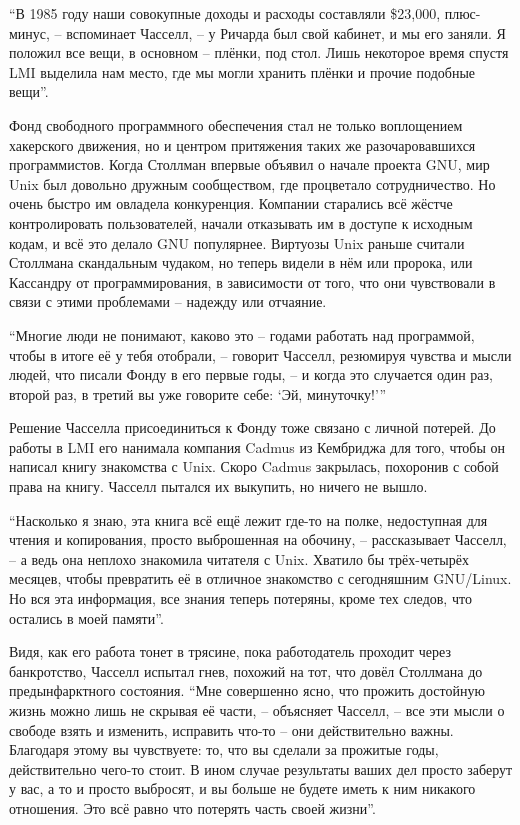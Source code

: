 \enquote{В 1985 году наши совокупные доходы и расходы составляли \$23,000, плюс-минус, -- вспоминает Часселл, -- у Ричарда был свой кабинет, и мы его заняли. Я положил все вещи, в основном -- плёнки, под стол. Лишь некоторое время спустя LMI выделила нам место, где мы могли хранить плёнки и прочие подобные вещи}.

Фонд свободного программного обеспечения стал не только воплощением хакерского движения, но и центром притяжения таких же разочаровавшихся программистов. Когда Столлман впервые объявил о начале проекта GNU, мир Unix был довольно дружным сообществом, где процветало сотрудничество. Но очень быстро им овладела конкуренция. Компании старались всё жёстче контролировать пользователей, начали отказывать им в доступе к исходным кодам, и всё это делало GNU популярнее. Виртуозы Unix раньше считали Столлмана скандальным чудаком, но теперь видели в нём или пророка, или Кассандру от программирования, в зависимости от того, что они чувствовали в связи с этими проблемами -- надежду или отчаяние.

\enquote{Многие люди не понимают, каково это -- годами работать над программой, чтобы в итоге её у тебя отобрали, -- говорит Часселл, резюмируя чувства и мысли людей, что писали Фонду в его первые годы, -- и когда это случается один раз, второй раз, в третий вы уже говорите себе: \enquote{Эй, минуточку!}\hspace{0.01in}}

Решение Часселла присоединиться к Фонду тоже связано с личной потерей. До работы в LMI его нанимала компания Cadmus из Кембриджа для того, чтобы он написал книгу знакомства с Unix. Скоро Cadmus закрылась, похоронив с собой права на книгу. Часселл пытался их выкупить, но ничего не вышло.

\enquote{Насколько я знаю, эта книга всё ещё лежит где-то на полке, недоступная для чтения и копирования, просто выброшенная на обочину, -- рассказывает Часселл, -- а ведь она неплохо знакомила читателя с Unix. Хватило бы трёх-четырёх месяцев, чтобы превратить её в отличное знакомство с сегодняшним GNU/Linux. Но вся эта информация, все знания теперь потеряны, кроме тех следов, что остались в моей памяти}.

Видя, как его работа тонет в трясине, пока работодатель проходит через банкротство, Часселл испытал гнев, похожий на тот, что довёл Столлмана до предынфарктного состояния. \enquote{Мне совершенно ясно, что прожить достойную жизнь можно лишь не скрывая её части, -- объясняет Часселл, -- все эти мысли о свободе взять и изменить, исправить что-то -- они действительно важны. Благодаря этому вы чувствуете: то, что вы сделали за прожитые годы, действительно чего-то стоит. В ином случае результаты ваших дел просто заберут у вас, а то и просто выбросят, и вы больше не будете иметь к ним никакого отношения. Это всё равно что потерять часть своей жизни}.
